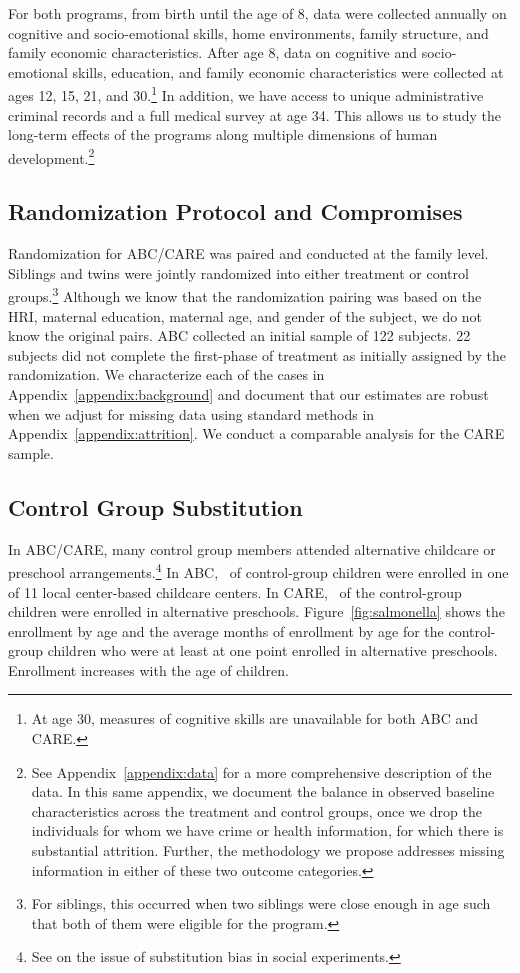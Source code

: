 For both programs, from birth until the age of 8, data were collected annually on cognitive and socio-emotional skills, home environments, family structure, and family economic characteristics. After age 8, data on cognitive and socio-emotional skills, education, and family economic characteristics were collected at ages 12, 15, 21, and 30.\footnote{At age 30, measures of cognitive skills are unavailable for both ABC and CARE.} In addition, we have access to unique administrative criminal records and a full medical survey at age 34. This allows us to study the long-term effects of the programs along multiple dimensions of human development.\footnote{See Appendix~\ref{appendix:data} for a more comprehensive description of the data. In this same appendix, we document the balance in observed baseline characteristics across the treatment and control groups, once we drop the individuals for whom we have crime or health information, for which there is substantial attrition. Further, the methodology we propose addresses missing information in either of these two outcome categories.}

\subsection{Randomization Protocol and Compromises} \label{section:randomization}

Randomization for ABC/CARE was paired and conducted at the family level. Siblings and twins were jointly randomized into either treatment or control groups.\footnote{For siblings, this occurred when two siblings were close enough in age such that both of them were eligible for the program.} Although we know that the randomization pairing was based on the HRI, maternal education, maternal age, and gender of the subject, we do not know the original pairs. ABC collected an initial sample of 122 subjects. 22 subjects did not complete the first-phase of treatment as initially assigned by the randomization. We characterize each of the cases in Appendix~\ref{appendix:background} and document that our estimates are robust when we adjust for missing data using standard methods in Appendix~\ref{appendix:attrition}. We conduct a comparable analysis for the CARE sample.

\subsection{Control Group Substitution}

In ABC/CARE, many control group members attended alternative childcare or preschool arrangements.\footnote{See \cite{Heckman_Hohmann_etal_2000_QJE} on the issue of substitution bias in social experiments.} In ABC, \treatsubsabc\ of control-group children were enrolled in one of 11 local center-based childcare centers. In CARE, \treatsubscarec\ of the control-group children were enrolled in alternative preschools. Figure~\ref{fig:salmonella} shows the enrollment by age and the average months of enrollment by age for the control-group children who were at least at one point enrolled in alternative preschools. Enrollment increases with the age of children.

